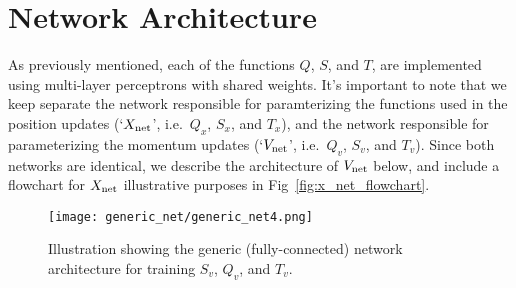 \documentclass[../main.tex]{subfiles}
\begin{document}
\section{Network Architecture}%
\label{subsec:l2hmc_network}
As previously mentioned, each of the functions $Q$, $S$, and $T$, are
implemented using multi-layer perceptrons with shared weights.
%
It's important to note that we keep separate the network responsible for
paramterizing the functions used in the position updates (`${X_{\mathrm{net}}}$', i.e.\
$Q_x$, $S_x$, and $T_x$), and the network responsible for parameterizing the
momentum updates (`${V_{\mathrm{net}}}$', i.e.\ $Q_v$, $S_v$, and $T_v$).
%
Since both networks are identical, we describe the architecture of ${V_{\mathrm{net}}}$
below, and include a flowchart for ${X_{\mathrm{net}}}$ illustrative purposes in
Fig~\ref{fig:x_net_flowchart}.
%
%
\begin{figure}[htpb]
  \centering
  \texttt{[image: generic\_net/generic\_net4.png]}
  \caption{Illustration showing the generic (fully-connected) network
    architecture for training $S_v$, $Q_v$, and
  $T_v$.}%
\label{fig:generic_net}
\end{figure}
%
\end{document}
